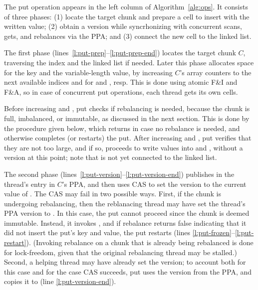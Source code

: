 The put operation appears in the left column of Algorithm~\ref{alg:ops}. It
consists of three phases: (1) locate the target chunk and
prepare a cell to insert with the written value; (2) obtain a version while syncrhonizing with
concurrent scans, gets, and rebalances via the PPA; and (3) connect  the new cell to the linked list.


The first phase (lines~\ref{l:put-prep}--\ref{l:put-prep-end})
locates the target chunk $C$, traversing the index and the linked list if needed. Later this phase allocates space for the key and the variable-length value, by increasing $C$'s array  counters to the next available indices  and  for  and , resp.
This is done using atomic F\&I and F\&A, so in case of concurrent put operations, each thread gets its own cells.

Before increasing  and , put checks if rebalancing is needed, because the chunk is full, imbalanced, or immutable, 
as discussed in the next section. This is done by the procedure  given below, 
which returns  in case no rebalance is needed, and otherwise completes (or restarts) the put.
After increasing  and , put verifies that they are not too large, 
and if so, proceeds to write values into  and , without a version at this point; note that  is not yet connected to the linked list.

The second phase (lines~\ref{l:put-version}--\ref{l:put-version-end}) publishes  in the thread's entry in $C$'s PPA,
and then uses CAS to set the version to the current value of .
The CAS may fail in two possible ways. First, if the chunk is undergoing rebalancing, then
the reblanacing thread may have set the thread's PPA version to .
In this case, the put cannot proceed since the chunk is deemed immutable. Instead, it invokes , 
and if rebalance returns false indicating that it did not insert the put's key and value, the put restarts
(lines \ref{l:put-frozen}--\ref{l:put-restart}).
(Invoking rebalance on a chunk that is already being rebalanced is done for lock-freedom, given that the original rebalancing thread
may be stalled.)
Second, a helping thread may have already set the version;
to account both for this case and for the case CAS succeeds,
put uses the version from the PPA, and copies it to  (line \ref{l:put-version-end}).

